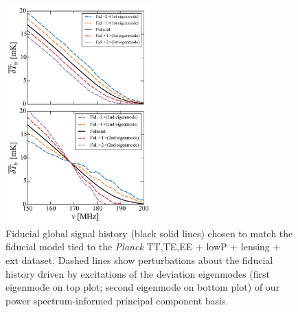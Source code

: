 \documentclass[twocolumn,aps,prd,nofootinbib,showpacs,superscriptaddress]{revtex4-1}
\begin{document}
\begin{figure}[!]
\centering
\includegraphics[width=0.5\textwidth]{figures/devEigenmodes.pdf}
\caption{Fiducial global signal history (black solid lines) chosen to match the fiducial model tied to the \emph{Planck} TT,TE,EE + lowP + lensing + ext dataset. Dashed lines show perturbations about the fiducial history driven by excitations of the deviation eigenmodes (first eigenmode on top plot; second eigenmode on bottom plot) of our power spectrum-informed principal component basis.}
\label{fig:devEigenmodes}
\end{figure}
\end{document}
